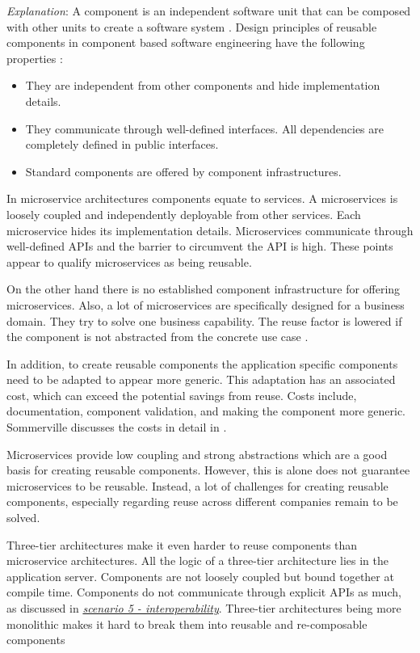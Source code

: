 \textit{Explanation}:
A component is an independent software unit that can be composed with other units to create a software system \cite[p. 467]{Sommerville2015}.
Design principles of reusable components in component based software engineering have the following properties \cite[p. 466]{Sommerville2015}: 
\begin{itemize}
\item They are independent from other components and hide implementation details. 
\item They communicate through well-defined interfaces. All dependencies are completely defined in public interfaces.
\item Standard components are offered by component infrastructures.
\end{itemize}

In microservice architectures components equate to services. 
A microservices is loosely coupled and independently deployable from other services.
Each microservice hides its implementation details.
Microservices communicate through well-defined \ac{API}s and the barrier to circumvent the \ac{API} is high.
These points appear to qualify microservices as being reusable.

On the other hand there is no established component infrastructure for offering microservices.
Also, a lot of microservices are specifically designed for a business domain. 
They try to solve one business capability. 
The reuse factor is lowered if the component is not abstracted from the concrete use case \citep[p. 475]{Sommerville2015}.

In addition, to create reusable components the application specific components need to be adapted to appear more generic.
This adaptation has an associated cost, which can exceed the potential savings from reuse.
Costs include, documentation, component validation, and making the component more generic.
Sommerville discusses the costs in detail in \cite[p. 475]{Sommerville2015}.

Microservices provide low coupling and strong abstractions which are a good basis for creating reusable components.
However, this is alone does not guarantee microservices to be reusable.
Instead, a lot of challenges for creating reusable components, especially regarding reuse across different companies remain to be solved.

Three-tier architectures make it even harder to reuse components than microservice architectures.
All the logic of a three-tier architecture lies in the application server.
Components are not loosely coupled but bound together at compile time.
Components do not communicate through explicit \ac{API}s as much, as discussed in \textit{\hyperref[quaMicro:s5]{scenario 5 - interoperability}}.
Three-tier architectures being more monolithic makes it hard to break them into reusable and re-composable components \citep[p. 7]{Newman2015}

